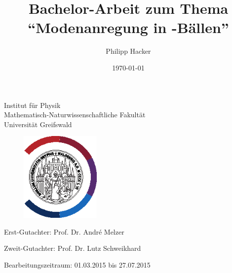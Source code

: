 \documentclass[numbers=noenddot,a4paper,notitlepage,twoside,BCOR15mm]{scrbook}
\title{Bachelor-Arbeit zum Thema \enquote{Modenanregung in \tilt{Yukawa}-Bällen}} %
\author{Philipp Hacker} %
\date{\today}
\begin{document}
	\maketitle

	\begin{center}

		Institut für Physik\\
		Mathematisch-Naturwissenschaftliche Fakultät\\
		Universität Greifswald

	\end{center}
	
	\vspace{0.5cm}

	\begin{figure}[H]
			\centering
			\includegraphics[width=0.35\textwidth]{figs/unilogo_NEU_schwarz.eps}
	\end{figure}

	\vspace{0.5cm}

	\begin{center}

			\hspace{-0.55cm} Erst-Gutachter: Prof. Dr. André Melzer \\ \vspace{0.25cm} %

			Zweit-Gutachter: Prof. Dr. Lutz Schweikhard \\ \vspace{0.25cm} %

			Bearbeitungszeitraum: 01.03.2015 bis 27.07.2015 \\ \vspace{0.25cm} %

	\end{center}

	\thispagestyle{empty}
	\newpage
	\thispagestyle{empty}
	\newpage
	\tableofcontents
	\newpage

	

	
	
	
		
	

	\printbibliography[heading=bibintoc]


	
\end{document}
